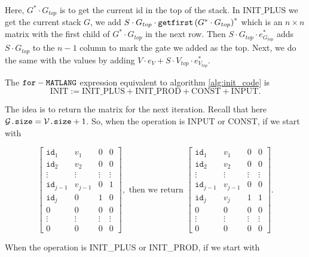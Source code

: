 Here, $G^*\cdot G_{top}$ is to get the current id in the top of the stack. In INIT${\_}$PLUS we get the current stack $G$, we add $S\cdot G_{top} \cdot \texttt{getfirst}\left(G^*\cdot G_{top} \right)^*$ which is an $n\times n$ matrix with the first child of $G^*\cdot G_{top}$ in the next row. Then $S\cdot G_{top}\cdot e_{G_{top}}^*$ adds $S\cdot G_{top}$ to the $n-1$ column to mark the gate we added as the top. Next, we do the same with the values by adding $V\cdot e_{V} + S\cdot V_{top}\cdot e_{V_{top}}^*$.

The $\texttt{for}-\texttt{MATLANG}$ expression equivalent to algorithm \ref{alg:init_code} is $$\text{INIT}:=\text{INIT{\_}PLUS}+\text{INIT{\_}PROD}+\text{CONST}+\text{INPUT}.$$

The idea is to return the matrix for the next iteration. Recall that here $\mathcal{G}\texttt{.size}=\mathcal{V}\texttt{.size} + 1$. So, when the operation is INPUT or CONST, if we start with

\[
\begin{bmatrix}
    \texttt{id}_1 & v_1 & 0 & 0 \\
    \texttt{id}_2 & v_2 & 0 & 0 \\
    \vdots & \vdots & \vdots & \vdots \\
    \texttt{id}_{j-1} & v_{j-1} & 0 & 1 \\
    \texttt{id}_j & 0 & 1 & 0 \\
    0 & 0 & 0 & 0 \\
    \vdots & \vdots & \vdots & \vdots \\
     0 & 0 & 0 & 0
\end{bmatrix}, \text{ then we return }
\begin{bmatrix}
    \texttt{id}_1 & v_1 & 0 & 0 \\
    \texttt{id}_2 & v_2 & 0 & 0 \\
    \vdots & \vdots & \vdots & \vdots \\
    \texttt{id}_{j-1} & v_{j-1} & 0 & 0 \\
    \texttt{id}_j & v_j & 1 & 1 \\
    0 & 0 & 0 & 0 \\
    \vdots & \vdots & \vdots & \vdots \\
     0 & 0 & 0 & 0
\end{bmatrix}.
\]

When the operation is INIT{\_}PLUS or INIT{\_}PROD, if we start with 

